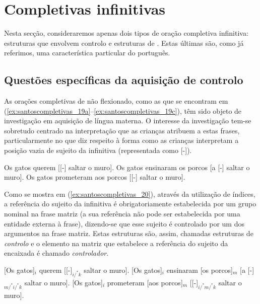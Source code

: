 \documentclass[output=paper]{LSP/langsci}
\begin{document}
\section{Completivas infinitivas}
\label{sec:santoscompletivas_completivas_infinitivas}

Nesta secção, consideraremos apenas dois tipos de oração completiva infinitiva: estruturas que envolvem controlo e estruturas de . Estas últimas são, como já referimos, uma característica particular do português. 

\subsection{Questões específicas da aquisição de controlo}
\label{subsec:santoscompletivas_questoes_controlo}

As orações completivas de  não flexionado, como as que se encontram em (\ref{ex:santoscompletivas_19a}--\ref{ex:santoscompletivas_19c}), têm sido objeto de investigação em aquisição de língua materna. O interesse da investigação tem-se sobretudo centrado na interpretação que as crianças atribuem a estas frases, particularmente no que diz respeito à forma como as crianças interpretam a posição vazia de sujeito da infinitiva (representada como [-]).

\ea\label{ex:santoscompletivas_19}
\ea\label{ex:santoscompletivas_19a} Os gatos querem [[-] saltar o muro].
\ex\label{ex:santoscompletivas_19b} Os gatos ensinaram os porcos [a [-] saltar o muro].
\ex\label{ex:santoscompletivas_19c} Os gatos prometeram aos porcos [[-] saltar o muro].
\zl

Como se mostra em (\ref{ex:santoscompletivas_20}), através da utilização de índices, a referência do sujeito da infinitiva é obrigatoriamente estabelecida por um grupo nominal na frase matriz (a sua referência não pode ser estabelecida por uma entidade externa à frase), dizendo-se que esse sujeito é controlado por um dos argumentos na frase matriz. Estas estruturas são, assim, chamadas estruturas de \textit{controlo} e o elemento na matriz que estabelece a referência do sujeito da encaixada é chamado \textit{controlador}.

\ea\label{ex:santoscompletivas_20}
\ea\label{ex:santoscompletivas_20a} [Os gatos]$_i$ querem [[-]$_{i/^{*}k}$ saltar o muro].
\ex\label{ex:santoscompletivas_20b} [Os gatos]$_i$ ensinaram [os porcos]$_m$ [a [-]$_{m/^{*}i/^{*}k}$ saltar o muro].
\ex\label{ex:santoscompletivas_20c} [Os gatos]$_i$ prometeram [aos porcos]$_m$ [[-]$_{i/^{*}m/^{*}k}$ saltar o muro].
\zl
\end{document}
